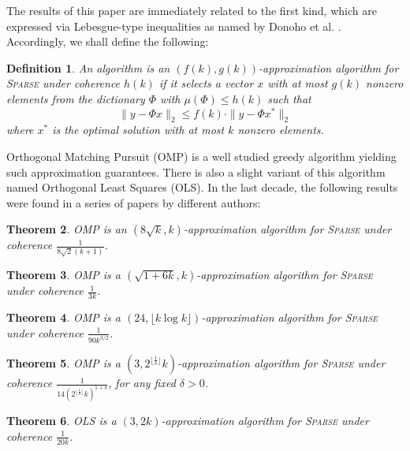 \documentclass[11pt]{article}
\newtheorem{thm}{Theorem}[section]
\newtheorem{defn}[thm]{Definition}
\begin{document}
The results of this paper are immediately related to the first
kind, which are expressed via Lebesgue-type inequalities as named
by Donoho et al. \cite{Lebesgue}. Accordingly, we shall
define the following:
\begin{defn}
An algorithm is an $(f(k),g(k))$-approximation algorithm for
\textsc{Sparse} under coherence $h(k)$ if it selects a vector $x$
with at most $g(k)$ nonzero elements from the dictionary $\Phi$
with $\mu(\Phi) \leq h(k)$ such that
$$
\|y-\Phi x \|_2 \leq f(k) \cdot \|y-\Phi x^*\|_2
$$
\noindent where $x^*$ is the optimal solution with at most $k$
nonzero elements.
\end{defn}

Orthogonal Matching Pursuit (OMP) is a well studied greedy
algorithm yielding such approximation guarantees. There is also
a slight variant of this algorithm named Orthogonal Least Squares
(OLS). In the last decade, the following results were found in
a series of papers by different authors:

\begin{thm} \cite{Gilbert}
OMP is an $(8\sqrt{k},k)$-approximation algorithm for
\textsc{Sparse} under coherence $\frac{1}{8\sqrt{2}(k+1)}$.
\end{thm}

\begin{thm} \cite{Tropp}
OMP is a $(\sqrt{1+6k},k)$-approximation algorithm for
\textsc{Sparse} under coherence $\frac{1}{3k}$.
\end{thm}

\begin{thm} \cite{Lebesgue}
OMP is a $(24,\lfloor k \log{k}\rfloor)$-approximation algorithm
for \textsc{Sparse} under coherence $\frac{1}{90k^{3/2}}$.
\end{thm}

\begin{thm} \cite{Zheltov}
OMP is a $(3,2^{\lfloor \frac{1}{\delta} \rfloor}k)$-approximation
algorithm for \textsc{Sparse} under coherence
$\frac{1}{14\left(2^{\lfloor \frac{1}{\delta} \rfloor}
k\right)^{1+\delta}}$, for any fixed $\delta > 0$.
\end{thm}

\begin{thm} \cite{Livshitz}
OLS is a $(3,2k)$-approximation algorithm for \textsc{Sparse}
under coherence $\frac{1}{20k}$.
\end{thm}
\end{document}
